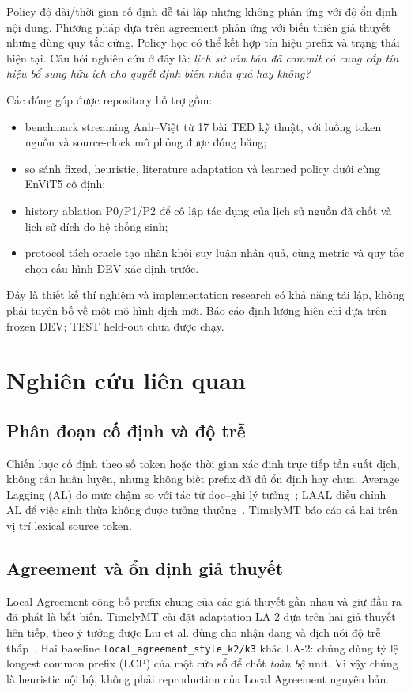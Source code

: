 \documentclass[conference]{IEEEtran}
\begin{document}
Policy độ dài/thời gian cố định dễ tái lập nhưng không phản ứng với độ ổn định nội dung. Phương pháp dựa trên agreement phản ứng với biến thiên giả thuyết nhưng dùng quy tắc cứng. Policy học có thể kết hợp tín hiệu prefix và trạng thái hiện tại. Câu hỏi nghiên cứu ở đây là: \emph{lịch sử văn bản đã commit có cung cấp tín hiệu bổ sung hữu ích cho quyết định biên nhân quả hay không?}

Các đóng góp được repository hỗ trợ gồm:
\begin{itemize}
  \item benchmark streaming Anh--Việt từ 17 bài TED kỹ thuật, với luồng token nguồn và source-clock mô phỏng được đóng băng;
  \item so sánh fixed, heuristic, literature adaptation và learned policy dưới cùng EnViT5 cố định;
  \item history ablation P0/P1/P2 để cô lập tác dụng của lịch sử nguồn đã chốt và lịch sử đích do hệ thống sinh;
  \item protocol tách oracle tạo nhãn khỏi suy luận nhân quả, cùng metric và quy tắc chọn cấu hình DEV xác định trước.
\end{itemize}
Đây là thiết kế thí nghiệm và implementation research có khả năng tái lập, không phải tuyên bố về một mô hình dịch mới. Báo cáo định lượng hiện chỉ dựa trên frozen DEV; TEST held-out chưa được chạy.

\section{Nghiên cứu liên quan}
\subsection{Phân đoạn cố định và độ trễ}
Chiến lược cố định theo số token hoặc thời gian xác định trực tiếp tần suất dịch, không cần huấn luyện, nhưng không biết prefix đã đủ ổn định hay chưa. Average Lagging (AL) đo mức chậm so với tác tử đọc--ghi lý tưởng~\cite{ma2019stacl}; LAAL điều chỉnh AL để việc sinh thừa không được tưởng thưởng~\cite{papi2022laal}. TimelyMT báo cáo cả hai trên vị trí lexical source token.

\subsection{Agreement và ổn định giả thuyết}
Local Agreement công bố prefix chung của các giả thuyết gần nhau và giữ đầu ra đã phát là bất biến. TimelyMT cài đặt adaptation LA-2 dựa trên hai giả thuyết liên tiếp, theo ý tưởng được Liu et al. dùng cho nhận dạng và dịch nói độ trễ thấp~\cite{liu2020partial}. Hai baseline \texttt{local\_agreement\_style\_k2/k3} khác LA-2: chúng dùng tỷ lệ longest common prefix (LCP) của một cửa sổ để chốt \emph{toàn bộ} unit. Vì vậy chúng là heuristic nội bộ, không phải reproduction của Local Agreement nguyên bản.
\end{document}
